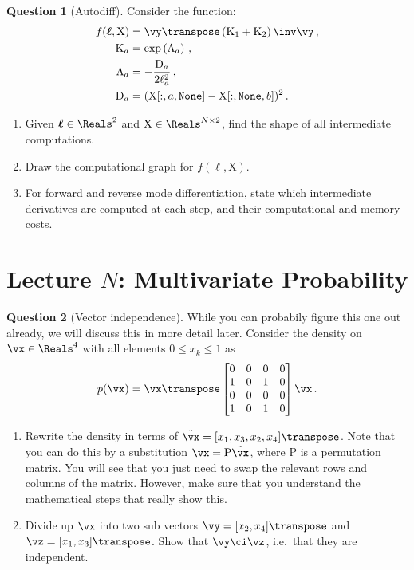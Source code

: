 \documentclass[a4paper]{article}
\newcommand{\mat}[1]{{\mathrm{{#1}}}} %
\theoremstyle{definition}
\newtheorem{question}{Question}
\begin{document}
\begin{question}[Autodiff]
\label{q:autodiff}
Consider the function:
\begin{align}
f(\boldsymbol \ell, \mat X) &= \vy\transpose \left(\mat K_1 + \mat K_2\right)\inv \vy\,, \\
\mat K_a &= \exp\left(\mat \Lambda_a\right) \,, \\
\mat \Lambda_a &= -\frac{\mat D_a}{2\ell_a^2} \,, \\
\mat D_a &= (\mat X[:, a, \text{\texttt{None}}] - \mat X[:, \text{\texttt{None}}, b])^2 \,.
\end{align}
\begin{enumerate}[label=\alph*.]
\item Given $\boldsymbol \ell \in \Reals^2$ and $\mat X \in \Reals^{N\times 2}$, find the shape of all intermediate computations.
\item Draw the computational graph for $f(\boldsymbol\ell, \mat X)$.
\item For forward and reverse mode differentiation, state which intermediate derivatives are computed at each step, and their computational and memory costs.
\end{enumerate}
\end{question}



\section{Lecture $N$: Multivariate Probability}
\begin{question}[Vector independence] {\color{red}While you can probabily figure this one out already, we will discuss this in more detail later.}
Consider the density on $\vx \in \Reals^4$ with all elements $0 \leq x_k \leq 1$ as
\begin{align}
p(\vx) = \vx\transpose \begin{bmatrix} 0 & 0 & 0 & 0 \\ 1 & 0 & 1 & 0 \\ 0 & 0 & 0 & 0 \\ 1 & 0 & 1 & 0\end{bmatrix} \vx \,.
\end{align}
\begin{enumerate}[label=\alph*.]
\item Rewrite the density in terms of $\tilde\vx = [x_1, x_3, x_2, x_4]\transpose$. Note that you can do this by a substitution $\vx = \mat P \tilde\vx$, where $\mat P$ is a permutation matrix. You will see that you just need to swap the relevant rows and columns of the matrix. However, make sure that you understand the mathematical steps that really show this.
\item Divide up $\vx$ into two sub vectors $\vy = [x_2, x_4]\transpose$ and $\vz = [x_1, x_3]\transpose$. Show that $\vy \ci \vz$, i.e.~that they are independent.
\end{enumerate}
\end{question}
\end{document}
